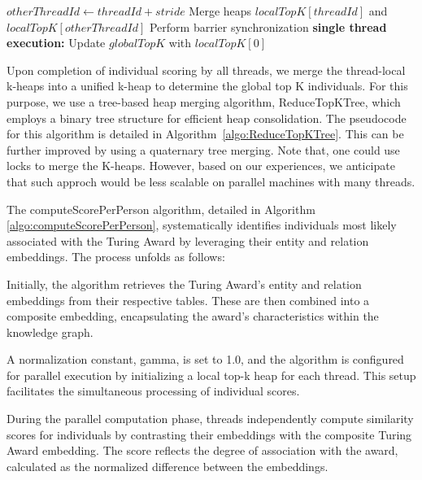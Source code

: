 \documentclass[sigconf]{acmart}
\begin{document}
\begin{algorithm*}
\begin{algorithmic}
     
            \State $otherThreadId \gets threadId + stride$
            \State Merge heaps $localTopK[threadId]$ and $localTopK[otherThreadId]$
        \EndIf
        \State Perform barrier synchronization
    \EndFor
    \State \textbf{single thread execution:}
    \State Update $globalTopK$ with $localTopK[0]$
\EndFunction
\end{algorithmic}
\caption{Tree-based reduction Algorithm to merge K-heaps from all threads into one single K-heap.}
\label{algo:ReduceTopKTree}
\end{algorithm*}

Upon completion of individual scoring by all threads, we merge the thread-local k-heaps into a unified k-heap to determine the global top K individuals. For this purpose, we use a tree-based heap merging algorithm, ReduceTopKTree, which employs a binary tree structure for efficient heap consolidation. The pseudocode for this algorithm is detailed in Algorithm~\ref{algo:ReduceTopKTree}. This can be further improved by using a quaternary tree merging. Note that, one could use locks to merge the K-heaps. However, based on our experiences, we anticipate that such approch would be less scalable on parallel machines with many threads.

The computeScorePerPerson algorithm, detailed in Algorithm \ref{algo:computeScorePerPerson}, systematically identifies individuals most likely associated with the Turing Award by leveraging their entity and relation embeddings. The process unfolds as follows:

Initially, the algorithm retrieves the Turing Award's entity and relation embeddings from their respective tables. These are then combined into a composite embedding, encapsulating the award's characteristics within the knowledge graph.

A normalization constant, gamma, is set to 1.0, and the algorithm is configured for parallel execution by initializing a local top-k heap for each thread. This setup facilitates the simultaneous processing of individual scores.

During the parallel computation phase, threads independently compute similarity scores for individuals by contrasting their embeddings with the composite Turing Award embedding. The score reflects the degree of association with the award, calculated as the normalized difference between the embeddings.
\end{document}
